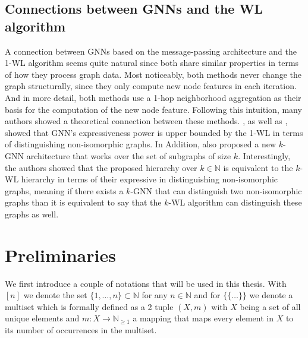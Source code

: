 \documentclass[11pt, dvipsnames, DIV=12]{scrreprt}
\theoremstyle{definition}
\newcommand{\MSopen}{\{\!\!\{}
\newcommand{\MSclose}{\}\!\!\}}
\begin{document}
\subsection{Connections between GNNs and the WL algorithm}
A connection between GNNs based on the message-passing architecture and the 1-WL algorithm seems quite natural since both share similar properties in terms of how they process graph data. Most noticeably, both methods never change the graph structurally, since they only compute new node features in each iteration. And in more detail, both methods use a 1-hop neighborhood aggregation as their basis for the computation of the new node feature. Following this intuition, many authors showed a theoretical connection between these methods. \cite{Morris2018}, as well as \cite{Xu2018}, showed that GNN's expressiveness power is upper bounded by the 1-WL in terms of distinguishing non-isomorphic graphs. In Addition, \cite{Morris2018} also proposed a new $k$-GNN architecture that works over the set of subgraphs of size $k$. Interestingly, the authors showed that the proposed hierarchy over $k \in \mathbb{N}$ is equivalent to the $k$-WL hierarchy in terms of their expressive in distinguishing non-isomorphic graphs, meaning if there exists a $k$-GNN that can distinguish two non-isomorphic graphs than it is equivalent to say that the $k$-WL algorithm can distinguish these graphs as well.

\section{Preliminaries}
We first introduce a couple of notations that will be used in this thesis. With $[n]$ we denote the set $\{1, \ldots, n\} \subset \mathbb{N}$ for any $n \in \mathbb{N}$ and for $\MSopen \ldots \MSclose$ we denote a multiset which is formally defined as a 2 tuple $(X, m)$ with $X$ being a set of all unique elements and $m: X \rightarrow \mathbb{N}_{\geq 1}$ a mapping that maps every element in $X$ to its number of occurrences in the multiset.
\end{document}
